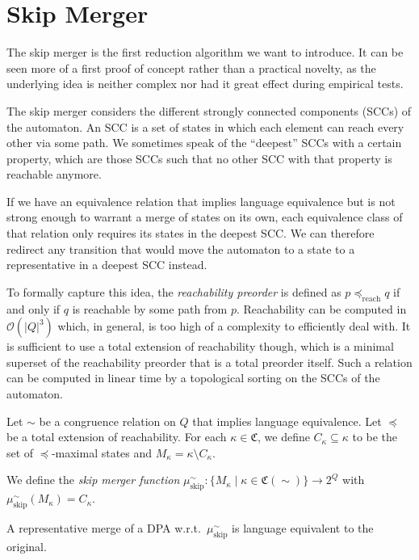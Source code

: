 
\section{Skip Merger}

The skip merger is the first reduction algorithm we want to introduce. It can be seen more of a first proof of concept rather than a practical novelty, as the underlying idea is neither complex nor had it great effect during empirical tests.

The skip merger considers the different strongly connected components (SCCs) of the automaton. An SCC is a set of states in which each element can reach every other via some path. We sometimes speak of the \enquote{deepest} SCCs with a certain property, which are those SCCs such that no other SCC with that property is reachable anymore.

If we have an equivalence relation that implies language equivalence but is not strong enough to warrant a merge of states on its own, each equivalence class of that relation only requires its states in the deepest SCC. We can therefore redirect any transition that would move the automaton to a state to a representative in a deepest SCC instead.

To formally capture this idea, the \emph{reachability preorder} is defined as $p \preceq_\text{reach} q$ if and only if $q$ is reachable by some path from $p$. Reachability can be computed in $\mathcal{O}(|Q|^3)$ which, in general, is too high of a complexity to efficiently deal with. It is sufficient to use a total extension of reachability though, which is a minimal superset of the reachability preorder that is a total preorder itself. Such a relation can be computed in linear time by a topological sorting on the SCCs of the automaton.

\begin{definition}
	Let $\sim$ be a congruence relation on $Q$ that implies language equivalence. Let $\preceq$ be a total extension of reachability. For each $\kappa \in \mathfrak{C}$, we define $C_\kappa \subseteq \kappa$ to be the set of $\preceq$-maximal states and $M_\kappa = \kappa \setminus C_\kappa$.
		
	We define the \emph{skip merger function} $\mu_\text{skip}^\sim : \{ M_\kappa \mid \kappa \in \mathfrak{C}(\sim) \} \rightarrow 2^Q$ with $\mu_\text{skip}^\sim(M_\kappa) = C_\kappa$.
\end{definition}

\begin{theorem}
	A representative merge of a DPA w.r.t.\ $\mu_\text{skip}^\sim$ is language equivalent to the original.
\end{theorem}

